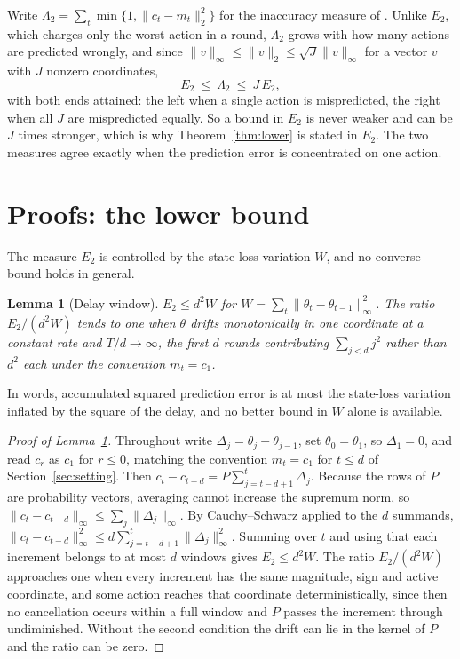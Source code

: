 \documentclass{article}
\newtheorem{lemma}{Lemma}
\theoremstyle{remark}
\newcommand{\etwo}{E_2}
\newcommand{\lamtwo}{\Lambda_2}
\begin{document}
Write $\lamtwo=\sum_t\min\{1,\|c_t-m_t\|_2^2\}$ for the inaccuracy measure of \citet{baron2025}.
Unlike $\etwo$, which charges only the worst action in a round, $\lamtwo$ grows with how many
actions are predicted wrongly, and since $\|v\|_\infty\le\|v\|_2\le\sqrt J\|v\|_\infty$ for a
vector $v$ with $J$ nonzero coordinates,
\[
\etwo\ \le\ \lamtwo\ \le\ J\,\etwo,
\]
with both ends attained: the left when a single action is mispredicted, the right when all $J$ are
mispredicted equally. So a bound in $\etwo$ is never weaker and can be $J$ times stronger, which is
why Theorem~\ref{thm:lower} is stated in $\etwo$. The two measures agree exactly when the
prediction error is concentrated on one action.

\section{Proofs: the lower bound}\label{app:proofs}

The measure $\etwo$ is controlled by the state-loss variation $W$, and no converse bound
holds in general.

\begin{lemma}[Delay window]\label{lem:window}
$\etwo\le d^2W$ for $W=\sum_t\|\theta_t-\theta_{t-1}\|_\infty^2$. The ratio $\etwo/(d^2W)$ tends to one when $\theta$ drifts monotonically in one coordinate at a
constant rate and $T/d\to\infty$, the first
$d$ rounds contributing $\sum_{j<d}j^2$ rather than $d^2$ each under the convention $m_t=c_1$.
\end{lemma}

In words, accumulated squared prediction error is at most the state-loss variation inflated by
the square of the delay, and no better bound in $W$ alone is available.

\begin{proof}[Proof of Lemma~\ref{lem:window}]
Throughout write $\Delta_j=\theta_j-\theta_{j-1}$, set $\theta_0=\theta_1$, so $\Delta_1=0$, and read
$c_r$ as $c_1$ for $r\le0$, matching the convention $m_t=c_1$ for $t\le d$ of
Section~\ref{sec:setting}. Then $c_t-c_{t-d}=P\sum_{j=t-d+1}^t\Delta_j$. Because the
rows of $P$ are probability vectors, averaging cannot increase the supremum norm, so
$\|c_t-c_{t-d}\|_\infty\le\sum_j\|\Delta_j\|_\infty$. By Cauchy--Schwarz applied to the $d$
summands, $\|c_t-c_{t-d}\|_\infty^2\le d\sum_{j=t-d+1}^t\|\Delta_j\|_\infty^2$. Summing over $t$
and using that each increment belongs to at most $d$ windows gives $\etwo\le d^2W$. The ratio $\etwo/(d^2W)$ approaches one when every increment has the same magnitude, sign and
active coordinate, and some action reaches that coordinate deterministically, since then no
cancellation occurs within a full window and $P$ passes the increment through undiminished.
Without the second condition the drift can lie in the kernel of $P$ and the ratio can be zero.
\end{proof}
\end{document}
